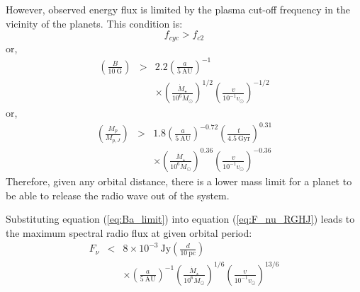 \documentclass{emulateapj}
\begin{document}

However, observed energy flux is limited by the plasma cut-off frequency in the vicinity of the planets. 
This condition is:
\begin{equation}
 f_{cyc} > f_{c2}
\end{equation} 
or, 
\begin{eqnarray}
 \left( \frac{B}{10~\mbox{G}} \right) &>& 2.2 \left( \frac{a}{5~\mbox{AU}} \right)^{-1} \\
 && \times \left( \frac{\dot M_{\star }}{10^6 \dot M_{\odot}} \right)^{1/2}  \left( \frac{v}{10^{-1}v_{\odot}} \right)^{-1/2} \label{eq:Ba_limit}
\end{eqnarray}
or, 
\begin{eqnarray}
 \left( \frac{M_p}{M_{p,J}} \right) &> & 1.8 \left( \frac{a}{5~\mbox{AU}} \right)^{-0.72} \left( \frac{t}{4.5~\mbox{Gyr}} \right)^{0.31} \\
 && \times \left( \frac{\dot M_{\star }}{10^6 \dot M_{\odot}} \right)^{0.36}  \left( \frac{v}{10^{-1}v_{\odot}} \right)^{-0.36} \label{eq:Ma_limit}
\end{eqnarray}
% 
Therefore, given any orbital distance, there is a lower mass limit for a planet to be able to release the  radio wave out of the system. 

Substituting equation (\ref{eq:Ba_limit}) into equation (\ref{eq:F_nu_RGHJ}) leads to the maximum spectral radio flux at given orbital period:
\begin{eqnarray}
F_{\nu} &<& 8 \times 10^{-3}~\mbox{Jy} \left( \frac{d}{10~\mbox{pc}} \right) \\
&& \times \left( \frac{a}{5~\mbox{AU}} \right)^{-1}  \left( \frac{\dot M_{\star }}{10^6 \dot M_{\odot}} \right)^{1/6} \left( \frac{v}{10^{-1} v_{\odot}} \right)^{13/6}
\end{eqnarray}
\end{document}
